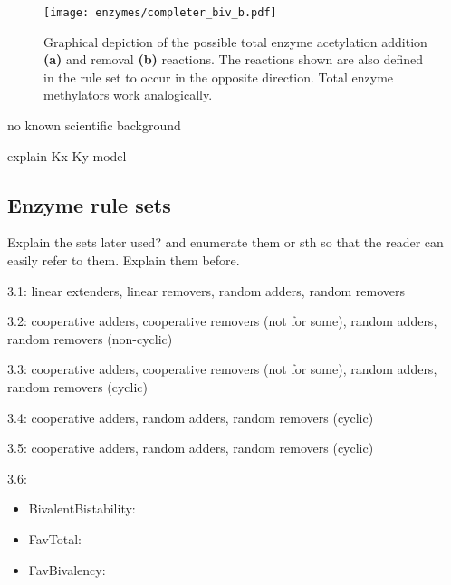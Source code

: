 \begin{figure}[htpb!]
\begin{minipage}{0.91\textwidth}
                        \begin{minipage}{0.8\textwidth}
                            \texttt{[image: enzymes/completer\_biv\_b.pdf]}
                        \end{minipage}
                    \end{minipage}
                    \caption{Graphical depiction of the possible total enzyme acetylation addition \textbf{(a)} and removal \textbf{(b)} reactions. The reactions shown are also defined in the rule set to occur in the opposite direction. Total enzyme methylators work analogically.}
                    \label{img:completerEnzymes}
                \end{figure}
                \begin{itemize}
                    {
                        \color{red}
                        \item no known scientific background
                        \item explain Kx Ky model
                    }
                \end{itemize}
        \subsection{Enzyme rule sets}
            \begin{itemize}
                {
                    \color{red}
                    \item Explain the sets later used? and enumerate them or sth so that the reader can easily refer to them. Explain them before.
                }
            \end{itemize}
            \begin{itemize}
                {
                    \color{red}
                    \item 3.1: linear extenders, linear removers, random adders, random removers
                    \item 3.2: cooperative adders, cooperative removers (not for some), random adders, random removers (non-cyclic)
                    \item 3.3: cooperative adders, cooperative removers (not for some), random adders, random removers (cyclic)
                    \item 3.4: cooperative adders, random adders, random removers (cyclic)
                    \item 3.5: cooperative adders, random adders, random removers (cyclic)
                    \item 3.6:
                        \begin{itemize}
                            \item BivalentBistability:
                            \item FavTotal:
                            \item FavBivalency:
                        \end{itemize}
                }
            \end{itemize}
